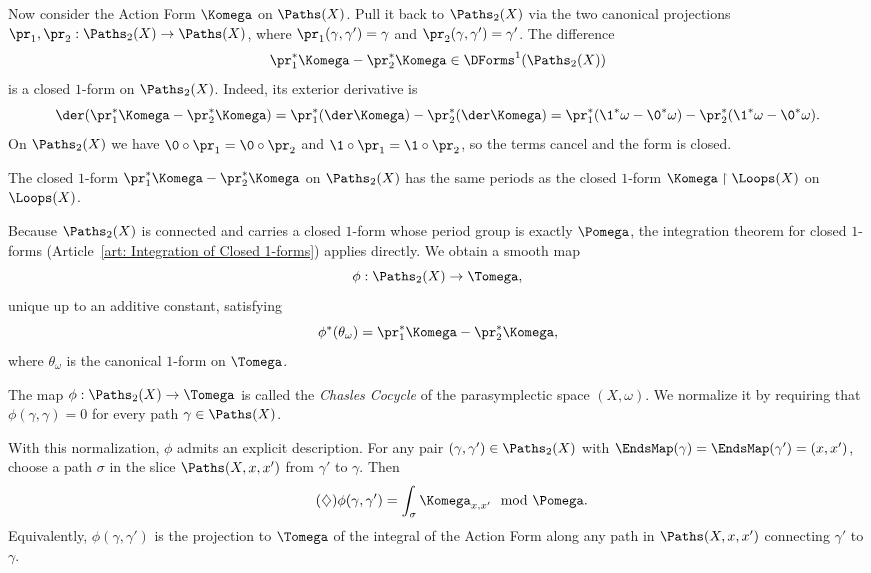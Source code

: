 \begin{article}
  Now consider the Action Form $\Komega$ on $\Paths(X)$.
  Pull it back to $\Paths_2(X)$ via the two canonical projections
  $\pr_1, \pr_2: \Paths_2(X) \to \Paths(X)$,
  where $\pr_1(\gamma,\gamma') = \gamma$ and $\pr_2(\gamma,\gamma') = \gamma'$.
  The difference
  \[
    \pr_1^*\Komega - \pr_2^*\Komega \in \DForms^1(\Paths_2(X))
    \]%
  is a closed $1$-form on $\Paths_2(X)$.
  Indeed,
  its exterior derivative is
  \[
    \der(\pr_1^*\Komega - \pr_2^*\Komega)
    = \pr_1^*(\der\Komega) - \pr_2^*(\der\Komega)
    = \pr_1^*(\1^*\omega - \0^*\omega) - \pr_2^*(\1^*\omega - \0^*\omega).
    \]%
  On $\Paths_2(X)$ we have $\0 \circ \pr_1 = \0 \circ \pr_2$ and
  $\1 \circ \pr_1 = \1 \circ \pr_2$,
  so the terms cancel and the form is closed.
  
  \begin{proposition}[2]
    The closed $1$-form $\pr_1^*\Komega - \pr_2^*\Komega$ on $\Paths_2(X)$
    has the same periods as the closed $1$-form
    $\Komega \restriction \Loops(X)$ on $\Loops(X)$.
  \end{proposition}
  
  Because $\Paths_2(X)$ is connected and carries a closed $1$-form
  whose period group is exactly $\Pomega$,
  the integration theorem for closed $1$-forms
  (Article~\ref{art: Integration of Closed 1-forms})
  applies directly.
  We obtain a smooth map
  \[
    \phi: \Paths_2(X) \to \Tomega,
    \]%
  unique up to an additive constant,
  satisfying
  \[
    \phi^*(\theta_\omega) = \pr_1^*\Komega - \pr_2^*\Komega,
    \]%
  where $\theta_\omega$ is the canonical $1$-form on $\Tomega$.
  
  \begin{definition}
    The map $\phi: \Paths_2(X) \to \Tomega$ is called the
    \emph{Chasles Cocycle} of the parasymplectic space $(X,\omega)$.
    We normalize it by requiring that
    $\phi(\gamma,\gamma) = 0$ for every path $\gamma \in \Paths(X)$.
  \end{definition}
  
  With this normalization,
  $\phi$ admits an explicit description.
  For any pair $(\gamma,\gamma') \in \Paths_2(X)$ with
  $\EndsMap(\gamma) = \EndsMap(\gamma') = (x,x')$,
  choose a path $\sigma$ in the slice $\Paths(X,x,x')$
  from $\gamma'$ to $\gamma$.
  Then
  \begin{equation}\tag{$\diamondsuit$}
    \phi(\gamma,\gamma') = \int_\sigma \Komega_{x,x'} \mod \Pomega.
  \end{equation}
  Equivalently,
  $\phi(\gamma,\gamma')$ is the projection to $\Tomega$ of the integral
  of the Action Form along any path in $\Paths(X,x,x')$
  connecting $\gamma'$ to $\gamma$.
  

\end{article}
